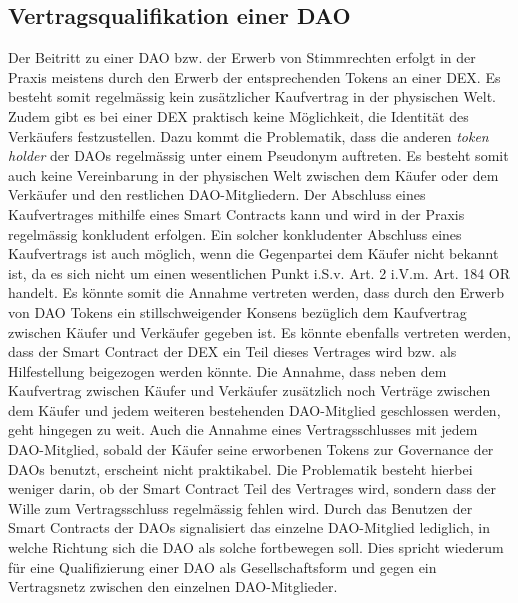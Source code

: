 \documentclass[a4paper,12pt]{report}
\begin{document}
    \subsection{Vertragsqualifikation einer DAO}
	\startsubsection
    Der Beitritt zu einer DAO bzw. der Erwerb von Stimmrechten erfolgt in der Praxis meistens durch den Erwerb der entsprechenden Tokens an einer DEX. Es besteht somit regelmässig kein zusätzlicher Kaufvertrag in der physischen Welt. Zudem gibt es bei einer DEX praktisch keine Möglichkeit, die Identität des Verkäufers festzustellen. Dazu kommt die Problematik, dass die anderen \textit{token holder} der DAOs regelmässig unter einem Pseudonym auftreten. Es besteht somit auch keine Vereinbarung in der physischen Welt zwischen dem Käufer oder dem Verkäufer und den restlichen DAO-Mitgliedern.  
    Der Abschluss eines Kaufvertrages mithilfe eines Smart Contracts kann und wird in der Praxis regelmässig konkludent erfolgen. Ein solcher konkludenter Abschluss eines Kaufvertrags ist auch möglich, wenn die Gegenpartei dem Käufer nicht bekannt ist, da es sich nicht um einen wesentlichen Punkt i.S.v. Art. 2 i.V.m. Art. 184 OR handelt. Es könnte somit die Annahme vertreten werden, dass durch den Erwerb von DAO Tokens ein stillschweigender Konsens bezüglich dem Kaufvertrag zwischen Käufer und Verkäufer gegeben ist. Es könnte ebenfalls vertreten werden, dass der Smart Contract der DEX ein Teil dieses Vertrages wird bzw. als Hilfestellung beigezogen werden könnte. Die Annahme, dass neben dem Kaufvertrag zwischen Käufer und Verkäufer zusätzlich noch Verträge zwischen dem Käufer und jedem weiteren bestehenden DAO-Mitglied geschlossen werden, geht hingegen zu weit. Auch die Annahme eines Vertragsschlusses mit jedem DAO-Mitglied, sobald der Käufer seine erworbenen Tokens zur Governance der DAOs benutzt, erscheint nicht praktikabel. Die Problematik besteht hierbei weniger darin, ob der Smart Contract Teil des Vertrages wird, sondern dass der Wille zum Vertragsschluss regelmässig fehlen wird. Durch das Benutzen der Smart Contracts der DAOs signalisiert das einzelne DAO-Mitglied lediglich, in welche Richtung sich die DAO als solche fortbewegen soll.
    Dies spricht wiederum für eine Qualifizierung einer DAO als Gesellschaftsform und gegen ein Vertragsnetz zwischen den einzelnen DAO-Mitglieder.
    \closesection
    \closesection
    
\end{document}
